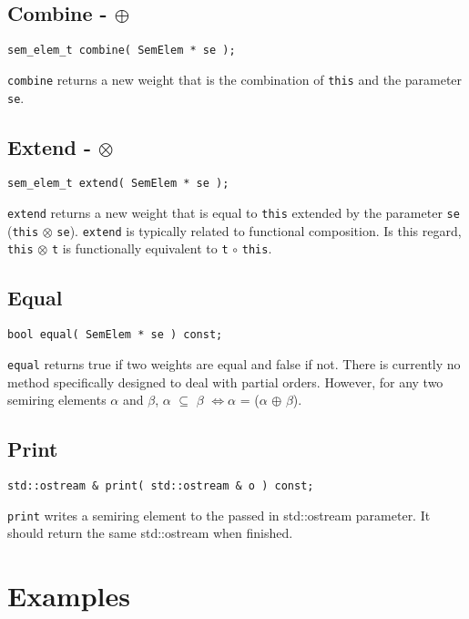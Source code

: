 \documentclass[english,a4paper,11pt]{article}
\theoremstyle{definition}
\begin{document}
\subsection{Combine - $\oplus$}
\begin{verbatim}
sem_elem_t combine( SemElem * se );
\end{verbatim}
\verb!combine! returns a new weight that is the combination of 
\verb!this! and the parameter \verb!se!.

\subsection{Extend - $\otimes$}
\begin{verbatim}
sem_elem_t extend( SemElem * se );
\end{verbatim}
\verb!extend! returns a new weight that is 
equal to \verb!this! extended by the parameter
\verb!se! (\verb!this! $\otimes$ \verb!se!). 
\verb!extend! is typically related to functional
composition. Is this regard, \verb!this! $\otimes$ \verb!t! is functionally
equivalent to \verb!t! $\circ$ \verb!this!.

\subsection{Equal}
\begin{verbatim}
bool equal( SemElem * se ) const;
\end{verbatim}
\verb!equal! returns true if two weights are equal and
false if not. There is currently no method specifically designed to deal with
partial orders. However, for any two semiring elements 
$\alpha$ and $\beta$, $\alpha$ $\subseteq$ $\beta$ $\Leftrightarrow$$\alpha$ =
($\alpha$ $\oplus$ $\beta$).

\subsection{Print}
\begin{verbatim}
std::ostream & print( std::ostream & o ) const;
\end{verbatim}
\verb!print! writes a semiring element to the passed in
std::ostream parameter. It should return the same std::ostream when finished.


\section{Examples}
\end{document}
